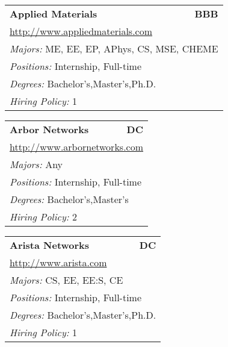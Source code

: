 \documentclass[twoside]{article}
\begin{document}
\begin{center}
\begin{multicols}{3}
\begin{FlushLeft}
\begin{minipage}{.9\columnwidth}
\end{minipage}
 
\begin{minipage}{.9\columnwidth}\begin{tabularx}{.95\columnwidth}{Xr}
                 {\Large\bf Applied Materials} & {\Large\bf BBB}\\
    \multicolumn{2}{p{.95\columnwidth}}{\url{http://www.appliedmaterials.com}}\\
    \multicolumn{2}{p{.95\columnwidth}}{\emph{Majors:} ME, EE, EP, APhys, CS, MSE, CHEME}\\
    \multicolumn{2}{p{.95\columnwidth}}{\emph{Positions:} Internship, Full-time}\\
    \multicolumn{2}{p{.95\columnwidth}}{\emph{Degrees:} Bachelor's,Master's,Ph.D.}\\
    \multicolumn{2}{p{.95\columnwidth}}{\emph{Hiring Policy:} 1}\\
    \end{tabularx}
    
\end{minipage}
 
\begin{minipage}{.9\columnwidth}\begin{tabularx}{.95\columnwidth}{Xr}
                 {\Large\bf Arbor Networks} & {\Large\bf DC}\\
    \multicolumn{2}{p{.95\columnwidth}}{\url{http://www.arbornetworks.com}}\\
    \multicolumn{2}{p{.95\columnwidth}}{\emph{Majors:} Any}\\
    \multicolumn{2}{p{.95\columnwidth}}{\emph{Positions:} Internship, Full-time}\\
    \multicolumn{2}{p{.95\columnwidth}}{\emph{Degrees:} Bachelor's,Master's}\\
    \multicolumn{2}{p{.95\columnwidth}}{\emph{Hiring Policy:} 2}\\
    \end{tabularx}
    
\end{minipage}
 
\begin{minipage}{.9\columnwidth}\begin{tabularx}{.95\columnwidth}{Xr}
                 {\Large\bf Arista Networks} & {\Large\bf DC}\\
    \multicolumn{2}{p{.95\columnwidth}}{\url{http://www.arista.com}}\\
    \multicolumn{2}{p{.95\columnwidth}}{\emph{Majors:} CS, EE, EE:S, CE}\\
    \multicolumn{2}{p{.95\columnwidth}}{\emph{Positions:} Internship, Full-time}\\
    \multicolumn{2}{p{.95\columnwidth}}{\emph{Degrees:} Bachelor's,Master's,Ph.D.}\\
    \multicolumn{2}{p{.95\columnwidth}}{\emph{Hiring Policy:} 1}\\
    \end{tabularx}
    

\end{minipage}
\end{FlushLeft}
\end{multicols}
\end{center}
\end{document}
